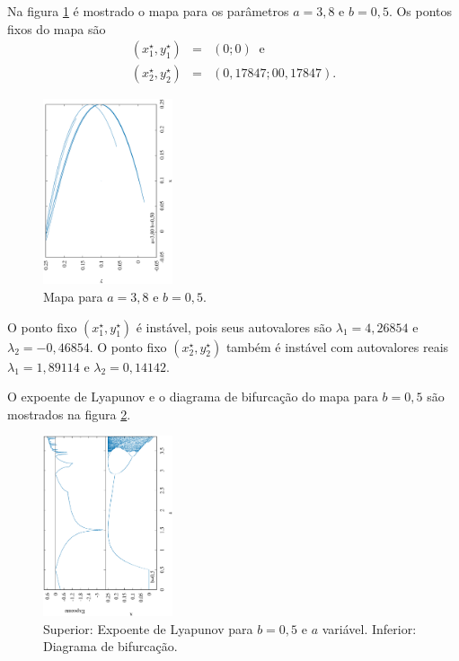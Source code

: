 \documentclass[brazilian, 12pt, a4paper, final]{article}
\begin{document}
\begin{multicols*}{2}
Na figura \ref{fig:380} é mostrado o mapa para os parâmetros $a=3,8$ e $b=0,5$.
Os pontos fixos do mapa são 
\begin{eqnarray}
	\nonumber (x^{\star}_1,y^{\star}_1)&=&(0; 0) \;\; \mathrm{e} \\
	\nonumber (x^{\star}_2,y^{\star}_2)&=&(0,17847; 00,17847).
\end{eqnarray}

\begin{figure}[H] 
  \centering
  \includegraphics[width=0.34\textwidth,angle=-90]{mapa_a380_b050.eps}
  \caption{Mapa para $a=3,8$ e $b=0,5$.}
  \label{fig:380}
\end{figure}



O ponto fixo $(x^{\star}_1,y^{\star}_1)$ é instável, pois seus autovalores são $\lambda_1=4,26854$ e $\lambda_2=-0,46854$. O ponto fixo $(x^{\star}_2,y^{\star}_2)$ também é instável com autovalores reais $\lambda_1=1,89114$ e $\lambda_2=0,14142$.

O expoente de Lyapunov e o diagrama de bifurcação do mapa para $b=0,5$ são mostrados na figura \ref{fig:05}.

\begin{figure}[H] 
  \centering
  \includegraphics[width=0.34\textwidth,angle=-90]{lyapunov_a00_b05.eps}
  \caption{Superior: Expoente de Lyapunov para $b=0,5$ e $a$ variável. Inferior: Diagrama de bifurcação.}
  \label{fig:05}
\end{figure}


\end{multicols*}
\end{document}
